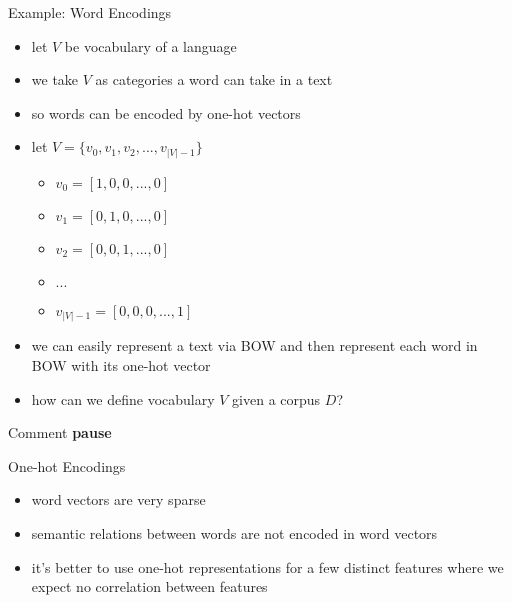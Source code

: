 \begin{frame}{Example: Word Encodings}
    \begin{itemize}
        \item<1-> let $V$ be vocabulary of a language 
        \item<2-> we take $V$ as categories a word can take in a text
        \item<3-> so words can be encoded by one-hot vectors
        \item<4-> let $V= \{v_0, v_1, v_2,...,v_{|V|-1} \}$
        \begin{itemize}
            \item<5-> $v_0 = [1,0,0,..., 0]$
            \item<6-> $v_1 = [0,1,0,..., 0]$
            \item<7-> $v_2 = [0,0,1,..., 0]$
            \item<7-> $...$
            \item<7-> $v_{|V|-1} = [0,0,0,..., 1]$
        \end{itemize}
        \item<8-> we can easily represent a text via BOW and then represent each word in BOW with its one-hot vector
        \item<9-> how can we define vocabulary $V$ given a corpus $D$?
    \end{itemize}
\end{frame}

\begin{frame}{Comment}
    \centering
    \textcolor{myblue}{\Large{\textbf{pause}}}
\end{frame}


\begin{frame}{One-hot Encodings}
\begin{itemize}
    \item<1-> word vectors are very sparse 
    \item<2-> semantic relations between words are not encoded in word vectors
    \item<3-> it's better to use one-hot representations for a few distinct features where we expect no correlation between features
\end{itemize}\end{frame}

